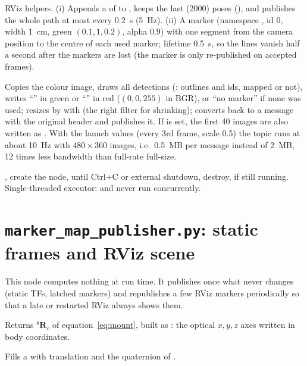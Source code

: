 RViz helpers. (i) Appends a  of  to , keeps the last
 (2000) poses (), and publishes the whole path at most every 0.2~s (5~Hz).
(ii) A  marker (namespace , id 0, width 1~cm, green $(0.1,1,0.2)$, alpha 0.9) with one
segment from the camera position to the centre of each used marker; lifetime 0.5~s, so the lines vanish half a second
after the markers are lost (the marker is only re-published on accepted frames).

Copies the colour image, draws all detections (: outlines and ids, mapped or not), writes
``'' in green or ``'' in red ($(0,0,255)$ in BGR), or ``no marker''
if none was used; resizes by  with  (the right filter for shrinking); converts
back to a  message with the original header and publishes it. If  is set, the first 40
images are also written as . With the launch values (every 3rd frame, scale 0.5) the topic runs at
about 10~Hz with $480\times360$ images, i.e.\ 0.5~MB per message instead of 2~MB, 12 times less bandwidth than
full-rate full-size.

, create the node,  until Ctrl+C or external shutdown, destroy,  if still
running. Single-threaded executor:  and  never run concurrently.

\section{\texttt{marker\_map\_publisher.py}: static frames and RViz scene}

This node computes nothing at run time. It publishes once what never changes (static TFs, latched markers) and
republishes a few RViz markers periodically so that a late or restarted RViz always shows them.

Returns ${}^b\mathbf R_c$ of equation~\eqref{eq:mount}, built as :
the optical $x,y,z$ axes written in body coordinates.

Fills a  with translation  and the quaternion of .

